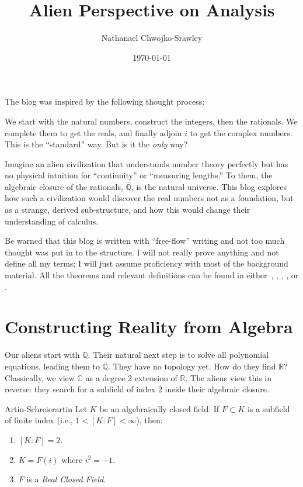 \documentclass{article}
\title{Alien Perspective on Analysis}
\author{Nathanael Chwojko-Srawley}
\date{\today}
\renewcommand{\maketitle}{
    \quad
    \vspace{1em}
  \begin{center}
      \LARGE\bfseries \thetitle \par
      \vspace{0.6em}
      \large
  \end{center}
    \vspace{1em}
}
\newcommand{\C}{{\mathbb{C}}}
\newcommand{\Q}{{\mathbb{Q}}}
\newcommand{\R}{{\mathbb{R}}}
\newcommand{\oln}[1]{{\overline{#1}}}
\begin{document}
\maketitle

The blog was inspired by the following thought process:
\begin{quoting}
    We start with the natural numbers, construct the integers, then the rationals. We complete them to get
    the reals, and finally adjoin $i$ to get the complex numbers. This is the ``standard'' way. But is it the \emph{only} way?
\end{quoting}

Imagine an alien civilization that understands number theory perfectly but has no physical intuition for
``continuity'' or ``measuring lengths.'' To them, the algebraic closure of the rationals, $\oln{\Q}$, is the
natural universe. This blog explores how such a civilization would discover the real numbers not as
a foundation, but as a strange, derived sub-structure, and how this would change their understanding of
calculus.

Be warned that this blog is written with ``free-flow'' writing and not too much thought was put in to the
structure. I will not really prove anything and not define all my terms; I will just assume proficiency with
most of the background material. All the theorems and relevant definitions can be found in
either~\cite{NateAlgebra}, \cite{NateAlgGeo}, \cite{NateTop}, \cite{NateComplexAnalysis}, or \cite{NateCFT}.

\section{Constructing Reality from Algebra}

Our aliens start with $\Q$. Their natural next step is to solve all polynomial equations, leading them to
$\oln{\Q}$. They have no topology yet. How do they find $\R$? Classically, we view $\C$ as a degree 2
extension of $\R$. The aliens view this in reverse: they search for a subfield of index 2 inside their
algebraic closure.

\begin{thm}{Artin-Schreier}{artin}
Let $K$ be an algebraically closed field. If $F \subset K$ is a subfield of finite index (i.e., $1 < [K:F] < \infty$), then:
\begin{enumerate}
    \item $[K:F] = 2$.
    \item $K = F(i)$ where $i^2 = -1$.
    \item $F$ is a \emph{Real Closed Field}.
\end{enumerate}
\end{thm}
\end{document}
